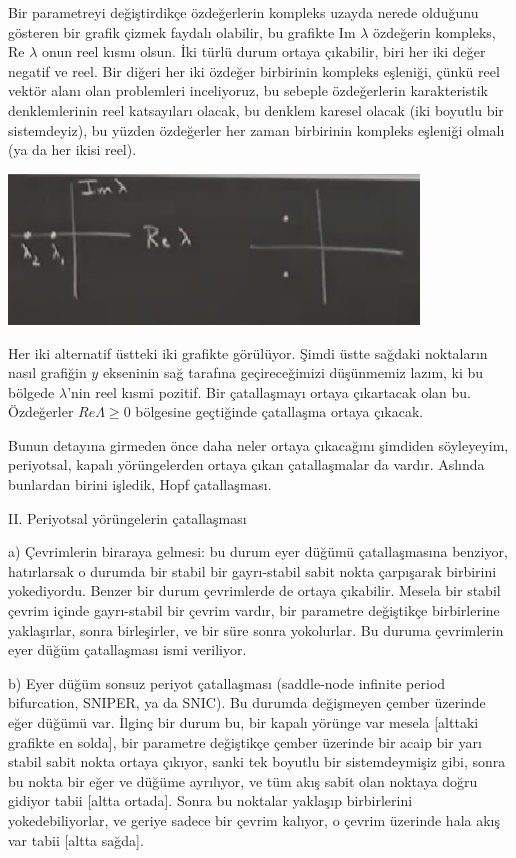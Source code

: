 \documentclass[12pt,fleqn]{article}\usepackage{../../common}
\begin{document}
Bir parametreyi değiştirdikçe özdeğerlerin kompleks uzayda nerede olduğunu
gösteren bir grafik çizmek faydalı olabilir, bu grafikte Im $\lambda$ özdeğerin
kompleks, Re $\lambda$ onun reel kısmı olsun. İki türlü durum ortaya çıkabilir,
biri her iki değer negatif ve reel. Bir diğeri her iki özdeğer birbirinin
kompleks eşleniği, çünkü reel vektör alanı olan problemleri inceliyoruz, bu
sebeple özdeğerlerin karakteristik denklemlerinin reel katsayıları olacak, bu
denklem karesel olacak (iki boyutlu bir sistemdeyiz), bu yüzden özdeğerler her
zaman birbirinin kompleks eşleniği olmalı (ya da her ikisi reel).

\includegraphics[height=4cm]{12_08.png}

Her iki alternatif üstteki iki grafikte görülüyor. Şimdi üstte sağdaki
noktaların nasıl grafiğin $y$ ekseninin sağ tarafına geçireceğimizi düşünmemiz
lazım, ki bu bölgede $\lambda$'nin reel kısmi pozitif. Bir çatallaşmayı ortaya
çıkartacak olan bu. Özdeğerler $Re \Lambda \ge 0$ bölgesine geçtiğinde
çatallaşma ortaya çıkacak.

Bunun detayına girmeden önce daha neler ortaya çıkacağını şimdiden söyleyeyim,
periyotsal, kapalı yörüngelerden ortaya çıkan çatallaşmalar da vardır. Aslında
bunlardan birini işledik, Hopf çatallaşması.

II. Periyotsal yörüngelerin çatallaşması

a) Çevrimlerin biraraya gelmesi: bu durum eyer düğümü çatallaşmasına benziyor,
hatırlarsak o durumda bir stabil bir gayrı-stabil sabit nokta çarpışarak
birbirini yokediyordu. Benzer bir durum çevrimlerde de ortaya çıkabilir. Mesela
bir stabil çevrim içinde gayrı-stabil bir çevrim vardır, bir parametre
değiştikçe birbirlerine yaklaşırlar, sonra birleşirler, ve bir süre sonra
yokolurlar. Bu duruma çevrimlerin eyer düğüm çatallaşması ismi veriliyor.

b) Eyer düğüm sonsuz periyot çatallaşması (saddle-node infinite period
bifurcation, SNIPER, ya da SNIC). Bu durumda değişmeyen çember üzerinde eğer
düğümü var. İlginç bir durum bu, bir kapalı yörünge var mesela [alttaki grafikte
  en solda], bir parametre değiştikçe çember üzerinde bir acaip bir yarı stabil
sabit nokta ortaya çıkıyor, sanki tek boyutlu bir sistemdeymişiz gibi, sonra bu
nokta bir eğer ve düğüme ayrılıyor, ve tüm akış sabit olan noktaya doğru gidiyor
tabii [altta ortada]. Sonra bu noktalar yaklaşıp birbirlerini yokedebiliyorlar,
ve geriye sadece bir çevrim kalıyor, o çevrim üzerinde hala akış var tabii
[altta sağda]. 
\end{document}
